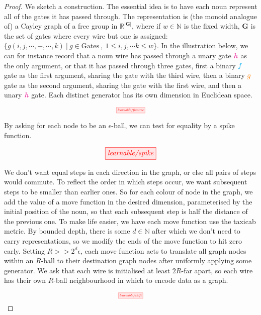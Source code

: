 \begin{theorem}
\begin{proof}

We sketch a construction. The essential idea is to have each noun represent all of the gates it has passed through. The representation is (the monoid analogue of) a Cayley graph of a free group in $\mathbb{R}^{|\mathbf{G}|}$, where if $w \in \mathbb{N}$ is the fixed width, $\mathbf{G}$ is the set of gates where every wire but one is assigned: $\{ g(i,j,\cdots,-,\cdots,k) \ | \ g \in \text{Gates} \ , \ 1 \leq i,j,\cdots k \leq w\}$. In the illustration below, we can for instance record that a noun wire has passed through a unary gate $\textcolor{magenta}{h}$ as the only argument, or that it has passed through three gates, first a binary $\textcolor{cyan}{f}$ gate as the first argument, sharing the gate with the third wire, then a binary $\textcolor{orange}{g}$ gate as the second argument, sharing the gate with the first wire, and then a unary $\textcolor{magenta}{h}$ gate. Each distinct generator has its own dimension in Euclidean space.

\[\scalebox{0.5}{\tikzfig{learnable/freetree}}\]

By asking for each node to be an $\epsilon$-ball, we can test for equality by a spike function.

\[\scalebox{1}{\tikzfig{learnable/spike}}\]

We don't want equal steps in each direction in the graph, or else all pairs of steps would commute. To reflect the order in which steps occur, we want subsequent steps to be smaller than earlier ones. So for each colour of node in the graph, we add the value of a move function in the desired dimension, parameterised by the initial position of the noun, so that each subsequent step is half the distance of the previous one. To make life easier, we have each move function use the taxicab metric. By bounded depth, there is some $d \in \mathbb{N}$ after which we don't need to carry representations, so we modify the ends of the move function to hit zero early. Setting $R >> 2^d \epsilon$, each move function acts to translate all graph nodes within an $R$-ball to their destination graph nodes after uniformly applying some generator. We ask that each wire is initialised at least $2R$-far apart, so each wire has their own $R$-ball neighbourhood in which to encode data as a graph. 

\[\scalebox{0.5}{\tikzfig{learnable/shift}}\]


\end{proof}
\end{theorem}
